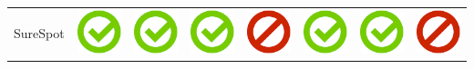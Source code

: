 \documentclass[10pt,foldmark,tumble]{leaflet}
\begin{document}
{{\begin{tabular}{ L{2cm} | C{2cm} | C{2cm} | C{2cm} | C{2cm} | C{2cm} | C{2cm} | C{2cm} | }
SureSpot & \includegraphics[scale=0.1]{pics/haken.png} & \includegraphics[scale=0.1]{pics/haken.png} & \includegraphics[scale=0.1]{pics/haken.png} & \includegraphics[scale=0.1]{pics/nohaken.png} & \includegraphics[scale=0.1]{pics/haken.png} & \includegraphics[scale=0.1]{pics/haken.png} & \includegraphics[scale=0.1]{pics/nohaken.png} \tabularnewline

\end{tabular}}}
\end{document}
